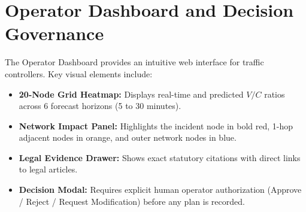 \section{Operator Dashboard and Decision Governance}
The Operator Dashboard provides an intuitive web interface for traffic controllers. Key visual elements include:
\begin{itemize}[leftmargin=1.5cm, label=$\bullet$]
  \item \textbf{20-Node Grid Heatmap:} Displays real-time and predicted $V/C$ ratios across 6 forecast horizons (5 to 30 minutes).
  \item \textbf{Network Impact Panel:} Highlights the incident node in bold red, 1-hop adjacent nodes in orange, and outer network nodes in blue.
  \item \textbf{Legal Evidence Drawer:} Shows exact statutory citations with direct links to legal articles.
  \item \textbf{Decision Modal:} Requires explicit human operator authorization (Approve / Reject / Request Modification) before any plan is recorded.
\end{itemize}
